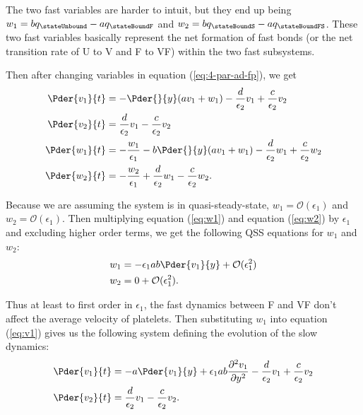 The two fast variables are harder to intuit, but they end up being
$w_1 = b q_\stateUnbound - a q_\stateBoundF$ and
$w_2 = b q_\stateBoundS - a q_\stateBoundFS$. These two fast variables
basically represent the net formation of fast bonds (or the net
transition rate of U to V and F to VF) within the two fast subsystems.

Then after changing variables in equation (\ref{eq:4-par-ad-fp}), we
get
\begin{align}
  \Pder{v_1}{t} &= -\Pder{}{y}(a v_1 + w_1) - \frac{d}{\epsilon_2} v_1
                  + \frac{c}{\epsilon_2} v_2 \label{eq:v1} \\
  \Pder{v_2}{t} &= \frac{d}{\epsilon_2} v_1 - \frac{c}{\epsilon_2} v_2
  \label{eq:v2} \\
  \Pder{w_1}{t} &= -\frac{w_1}{\epsilon_1} - b\Pder{}{y} (a v_1 + w_1)
                  - \frac{d}{\epsilon_2} w_1 + \frac{c}{\epsilon_2}
                  w_2 \label{eq:w1} \\
  \Pder{w_2}{t} &= -\frac{w_2}{\epsilon_1} + \frac{d}{\epsilon_2} w_1
                  - \frac{c}{\epsilon_2} w_2. \label{eq:w2}
\end{align}

Because we are assuming the system is in quasi-steady-state,
$w_1 = \mathcal{O}(\epsilon_1)$ and $w_2 =
\mathcal{O}(\epsilon_1)$. Then multiplying equation (\ref{eq:w1}) and
equation (\ref{eq:w2}) by $\epsilon_1$ and excluding higher order terms,
we get the following QSS equations for $w_1$ and $w_2$:
\begin{align}
  \label{eq:w1-reduced}
  w_1 &= -\epsilon_1 a b \Pder{v_1}{y} + \mathcal{O}(\epsilon_1^2) \\
  \label{eq:w2-reduced}
  w_2 &= 0 + \mathcal{O}(\epsilon_1^2).
\end{align}

Thus at least to first order in $\epsilon_1$, the fast dynamics between
F and VF don't affect the average velocity of platelets. Then
substituting $w_1$ into equation (\ref{eq:v1}) gives us the following
system defining the evolution of the slow dynamics:
\begin{align}
  \label{eq:v1-reduced}
  \Pder{v_1}{t} &= -a \Pder{v_1}{y} + \epsilon_1 a b \frac{\partial^2
                  v_1}{\partial y^2} - \frac{d}{\epsilon_2} v_1 +
                  \frac{c}{\epsilon_2} v_2 \\
  \label{eq:v2-reduced}
  \Pder{v_2}{t} &= \frac{d}{\epsilon_2} v_1 - \frac{c}{\epsilon_2} v_2.
\end{align}

